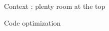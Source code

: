 \begin{Frame}{Context : plenty room at the top}
\begin{block}{Code optimization}
  \begin{center}
  \end{center}
\end{block}

\end{Frame}

